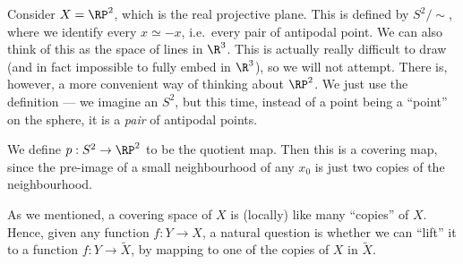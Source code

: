 \documentclass[a4paper]{article}
\begin{document}
\begin{eg}
  Consider $X = \RP^2$, which is the real projective plane. This is defined by $S^2/{\sim}$, where we identify every $x\simeq -x$, i.e.\ every pair of antipodal point. We can also think of this as the space of lines in $\R^3$. This is actually really difficult to draw (and in fact impossible to fully embed in $\R^3$), so we will not attempt. There is, however, a more convenient way of thinking about $\RP^2$. We just use the definition --- we imagine an $S^2$, but this time, instead of a point being a ``point'' on the sphere, it is a \emph{pair} of antipodal points.
  \begin{center}
  \end{center}
  We define $p: S^2 \to \RP^2$ to be the quotient map. Then this is a covering map, since the pre-image of a small neighbourhood of any $x_0$ is just two copies of the neighbourhood.
\end{eg}

As we mentioned, a covering space of $X$ is (locally) like many ``copies'' of $X$. Hence, given any function $f: Y \to X$, a natural question is whether we can ``lift'' it to a function $f: Y \to \tilde{X}$, by mapping to one of the copies of $X$ in $\tilde{X}$.
\end{document}
